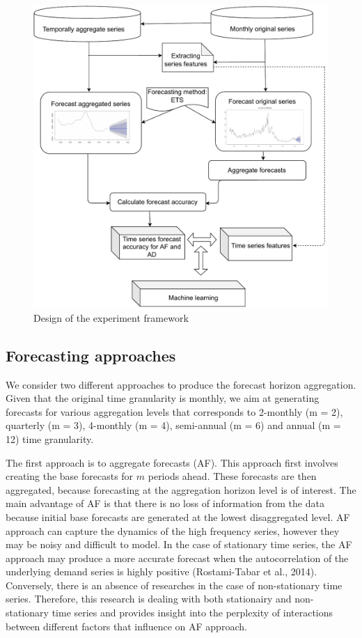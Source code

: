 \documentclass[]{elsarticle} %
\begin{document}
\begin{figure}[H]

{\centering \includegraphics[width=0.7\linewidth]{img/300dpi/experiment_design} 

}

\caption{Design of the experiment framework}\label{fig:expdes}
\end{figure}

\hypertarget{forecasting-approaches}{%
\subsection{Forecasting approaches}\label{forecasting-approaches}}

We consider two different approaches to produce the forecast horizon
aggregation. Given that the original time granularity is monthly, we aim
at generating forecasts for various aggregation levels that corresponds
to 2-monthly (m = 2), quarterly (m = 3), 4-monthly (m = 4), semi-annual
(m = 6) and annual (m = 12) time granularity.

The first approach is to aggregate forecasts (AF). This approach first
involves creating the base forecasts for \(m\) periods ahead. These
forecasts are then aggregated, because forecasting at the aggregation
horizon level is of interest. The main advantage of AF is that there is
no loss of information from the data because initial base forecasts are
generated at the lowest disaggregated level. AF approach can capture the
dynamics of the high frequency series, however they may be noisy and
difficult to model. In the case of stationary time series, the AF
approach may produce a more accurate forecast when the autocorrelation
of the underlying demand series is highly positive (Rostami-Tabar et
al., 2014). Conversely, there is an absence of researches in the case of
non-stationary time series. Therefore, this research is dealing with
both stationairy and non-stationary time series and provides insight
into the perplexity of interactions between different factors that
influence on AF approach.
\end{document}
